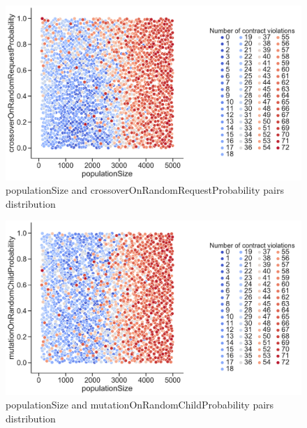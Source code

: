 \begin{figure}
	\centering
	\includegraphics[width=\textwidth]{images/PairsDistr/populationSize_crossoverOnRandomRequestProbability.pdf}
	\caption[populationSize and crossoverOnRandomRequestProbability pairs distribution]{populationSize and crossoverOnRandomRequestProbability pairs distribution}
	\label{fig:populationSize_crossoverOnRandomRequestProbability_pair}
\end{figure}
\clearpage
\begin{figure}
	\centering
	\includegraphics[width=\textwidth]{images/PairsDistr/populationSize_mutationOnRandomChildProbability.pdf}
	\caption[populationSize and mutationOnRandomChildProbability pairs distribution]{populationSize and mutationOnRandomChildProbability pairs distribution}
	\label{fig:populationSize_mutationOnRandomChildProbability_pair}
\end{figure}
\clearpage
